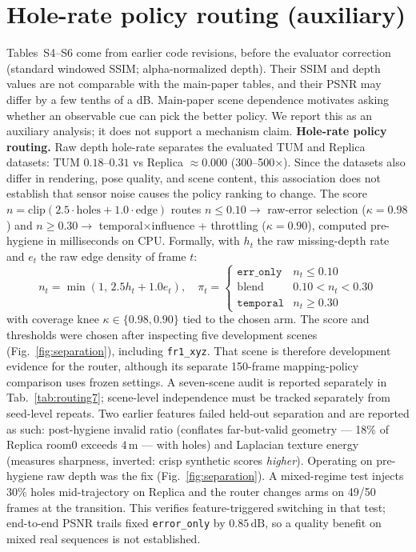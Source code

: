 \documentclass[10pt,twocolumn,letterpaper]{article}
\begin{document}
\section{Hole-rate policy routing (auxiliary)}
Tables~S4--S6 come from earlier code revisions, before the evaluator correction (standard windowed SSIM; alpha-normalized depth). Their SSIM and depth values are not comparable with the main-paper tables, and their PSNR may differ by a few tenths of a dB.
Main-paper scene dependence motivates asking whether an observable cue can pick the better policy. We report this as an auxiliary analysis; it does not support a mechanism claim.
\textbf{Hole-rate policy routing.}
Raw depth hole-rate separates the evaluated TUM and Replica datasets: TUM $0.18$--$0.31$ vs Replica $\approx 0.000$ (300--500$\times$). Since the datasets also differ in rendering, pose quality, and scene content, this association does not establish that sensor noise causes the policy ranking to change.
The score $n = \mathrm{clip}(2.5 \cdot \mathrm{holes} + 1.0 \cdot \mathrm{edge})$ routes $n \le 0.10 \to$ raw-error selection ($\kappa = 0.98$) and $n \ge 0.30 \to$ temporal$\times$influence + throttling ($\kappa = 0.90$), computed pre-hygiene in milliseconds on CPU.
Formally, with $h_t$ the raw missing-depth rate and $e_t$ the raw edge density of frame $t$:
{\footnotesize
\begin{equation}
n_t = \min(1,\, 2.5 h_t + 1.0 e_t), \quad
\pi_t = \begin{cases}
\texttt{err\_only} & n_t \le 0.10 \\
\text{blend} & 0.10 < n_t < 0.30 \\
\texttt{temporal} & n_t \ge 0.30
\end{cases}
\end{equation}
}
with coverage knee $\kappa \in \{0.98, 0.90\}$ tied to the chosen arm.
The score and thresholds were chosen after inspecting five development scenes (Fig.~\ref{fig:separation}), including \texttt{fr1\_xyz}. That scene is therefore development evidence for the router, although its separate 150-frame mapping-policy comparison uses frozen settings. A seven-scene audit is reported separately in Tab.~\ref{tab:routing7}; scene-level independence must be tracked separately from seed-level repeats.
Two earlier features failed held-out separation and are reported as such: post-hygiene invalid ratio (conflates far-but-valid geometry --- 18\% of Replica room0 exceeds $4\,\mathrm{m}$ --- with holes) and Laplacian texture energy (measures sharpness, inverted: crisp synthetic scores \textit{higher}).
Operating on pre-hygiene raw depth was the fix (Fig.~\ref{fig:separation}).
A mixed-regime test injects 30\% holes mid-trajectory on Replica and the router changes arms on 49/50 frames at the transition. This verifies feature-triggered switching in that test; end-to-end PSNR trails fixed \texttt{error\_only} by $0.85\,\mathrm{dB}$, so a quality benefit on mixed real sequences is not established.
\end{document}
